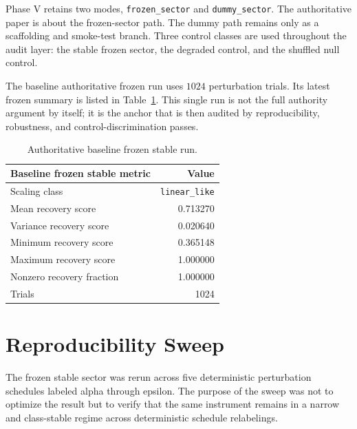 \documentclass[11pt]{article}
\begin{document}
Phase V retains two modes, \texttt{frozen\_sector} and \texttt{dummy\_sector}. The authoritative paper is about the frozen-sector path. The dummy path remains only as a scaffolding and smoke-test branch. Three control classes are used throughout the audit layer: the stable frozen sector, the degraded control, and the shuffled null control.

The baseline authoritative frozen run uses $1024$ perturbation trials. Its latest frozen summary is listed in Table~\ref{tab:baseline}. This single run is not the full authority argument by itself; it is the anchor that is then audited by reproducibility, robustness, and control-discrimination passes.

\begin{table}[t]
\centering
\small
\begin{tabular}{@{}lr@{}}
\toprule
Baseline frozen stable metric & Value \\
\midrule
Scaling class & \texttt{linear\_like} \\
Mean recovery score & 0.713270 \\
Variance recovery score & 0.020640 \\
Minimum recovery score & 0.365148 \\
Maximum recovery score & 1.000000 \\
Nonzero recovery fraction & 1.000000 \\
Trials & 1024 \\
\bottomrule
\end{tabular}
\caption{Authoritative baseline frozen stable run.}
\label{tab:baseline}
\end{table}

\section{Reproducibility Sweep}

The frozen stable sector was rerun across five deterministic perturbation schedules labeled alpha through epsilon. The purpose of the sweep was not to optimize the result but to verify that the same instrument remains in a narrow and class-stable regime across deterministic schedule relabelings.
\end{document}
